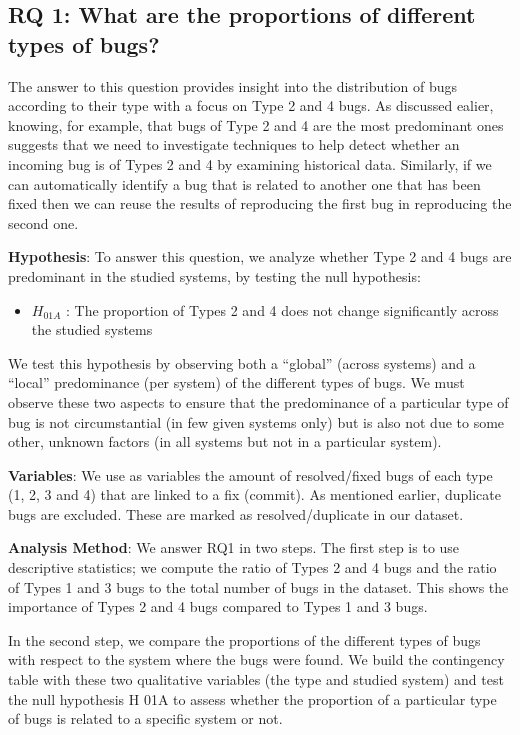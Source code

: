 \subsection{RQ 1: What are the proportions of different types of
bugs?}\label{rq-1-what-are-the-proportions-of-different-types-of-bugs}

The answer to this question provides insight into the distribution of
bugs according to their type with a focus on Type 2 and 4 bugs. As
discussed ealier, knowing, for example, that bugs of Type 2 and 4 are
the most predominant ones suggests that we need to investigate
techniques to help detect whether an incoming bug is of Types 2 and 4 by
examining historical data. Similarly, if we can automatically identify a
bug that is related to another one that has been fixed then we can reuse
the results of reproducing the first bug in reproducing the second one.

{\textbf{Hypothesis}}: To answer this question, we analyze whether Type
2 and 4 bugs are predominant in the studied systems, by testing the null
hypothesis:

\begin{itemize}
\tightlist
\item
  \(H_{01A}\) : The proportion of Types 2 and 4 does not change
  significantly across the studied systems
\end{itemize}

We test this hypothesis by observing both a ``global'' (across systems)
and a ``local'' predominance (per system) of the different types of
bugs. We must observe these two aspects to ensure that the predominance
of a particular type of bug is not circumstantial (in few given systems
only) but is also not due to some other, unknown factors (in all systems
but not in a particular system).

{\textbf{Variables}}: We use as variables the amount of resolved/fixed
bugs of each type (1, 2, 3 and 4) that are linked to a fix (commit). As
mentioned earlier, duplicate bugs are excluded. These are marked as
resolved/duplicate in our dataset.

{\textbf{Analysis Method}}: We answer RQ1 in two steps. The first step
is to use descriptive statistics; we compute the ratio of Types 2 and 4
bugs and the ratio of Types 1 and 3 bugs to the total number of bugs in
the dataset. This shows the importance of Types 2 and 4 bugs compared to
Types 1 and 3 bugs.

In the second step, we compare the proportions of the different types of
bugs with respect to the system where the bugs were found. We build the
contingency table with these two qualitative variables (the type and
studied system) and test the null hypothesis H 01A to assess whether the
proportion of a particular type of bugs is related to a specific system
or not.

